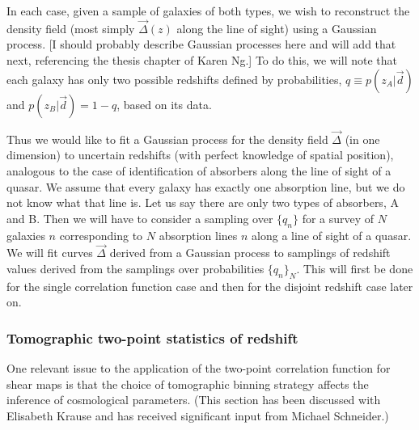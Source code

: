 \documentclass[12pt, onecolumn]{emulateapj}
\begin{document}
In each case, given a sample of galaxies of both types, we wish to reconstruct the density field (most simply $\vec{\Delta}(z)$ along the line of sight) using a Gaussian process.  [I should probably describe Gaussian processes here and will add that next, referencing the thesis chapter of Karen Ng.]  To do this, we will note that each galaxy has only two possible redshifts defined by probabilities, $q\equiv p(z_{A}|\vec{d})$ and $p(z_{B}|\vec{d})=1-q$, based on its data.  

Thus we would like to fit a Gaussian process for the density field $\vec{\Delta}$ (in one dimension) to uncertain redshifts (with perfect knowledge of spatial position), analogous to the case of identification of absorbers along the line of sight of a quasar.  We assume that every galaxy has exactly one absorption line, but we do not know what that line is.  Let us say there are only two types of absorbers, A and B.  Then we will have to consider a sampling over $\{q_{n}\}$ for a survey of $N$ galaxies $n$ corresponding to $N$ absorption lines $n$ along a line of sight of a quasar.  We will fit curves $\vec{\Delta}$ derived from a Gaussian process to samplings of redshift values derived from the samplings over probabilities $\{q_{n}\}_{N}$.  This will first be done for the single correlation function case and then for the disjoint redshift case later on.

\subsubsection{Tomographic two-point statistics of redshift}

One relevant issue to the application of the two-point correlation function for shear maps is that the choice of tomographic binning strategy affects the inference of cosmological parameters.  (This section has been discussed with Elisabeth Krause and has received significant input from Michael Schneider.)
\end{document}
